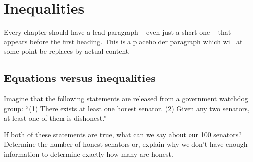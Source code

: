 \chapter{Inequalities}
\label{ch:inequalities}




Every chapter should have a lead paragraph -- even just a short one -- that appears before the first heading. This is a placeholder paragraph which will at some point be replaces by actual content.

\section{Equations versus inequalities}
\label{sec:ineqintro}

\begin{boxedexplore}
Imagine that the following statements are released from a government watchdog group: ``(1) There exists at least one honest senator. (2) Given any two senators, at least one of them is dishonest.''

If both of these statements are true, what can we say about our 100 senators? Determine the number of honest senators or, explain why we don't have enough information to determine exactly how many are honest.
\end{boxedexplore}

